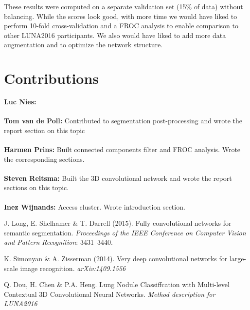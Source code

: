 \documentclass{article}
\begin{document}
These results were computed on a separate validation set (15\% of data) without balancing.
While the scores look good, with more time we would have liked to perform 10-fold cross-validation and a FROC analysis to enable comparison to other LUNA2016 participants.
We also would have liked to add more data augmentation and to optimize the network structure.

\appendix
\section{Contributions}
\textbf{Luc Nies:} \\
\\
\textbf{Tom van de Poll:} Contributed to segmentation post-processing and wrote the report section on this topic\\
\\
\textbf{Harmen Prins:} Built connected components filter and FROC analysis. Wrote the corresponding sections.\\
\\
\textbf{Steven Reitsma:} Built the 3D convolutional network and wrote the report sections on this topic.\\
\\
\textbf{Inez Wijnands:} Access cluster. Wrote introduction section.



\begin{thebibliography}{}
J. Long, E. Shelhamer \& T. Darrell (2015). Fully convolutional networks for semantic segmentation. \emph{Proceedings of the IEEE Conference on Computer Vision and Pattern Recognition}: 3431--3440.

K. Simonyan \& A. Zisserman (2014). Very deep convolutional networks for large-scale image recognition. \emph{arXiv:1409.1556}

Q. Dou, H. Chen \& P.A. Heng. Lung Nodule Classiffcation with Multi-level Contextual 3D Convolutional Neural Networks. \emph{Method description for LUNA2016}


\end{thebibliography}
\end{document}
